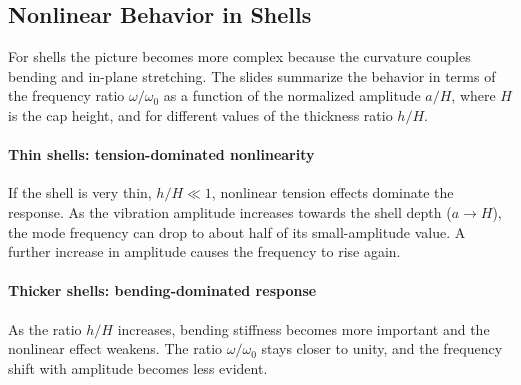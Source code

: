 \subsection{Nonlinear Behavior in Shells}

For shells the picture becomes more complex because the curvature couples bending and in-plane stretching. The slides summarize the behavior in terms of the frequency ratio \( \omega/\omega_0 \) as a function of the normalized amplitude \( a/H \), where \( H \) is the cap height, and for different values of the thickness ratio \( h/H \).

\paragraph{Thin shells: tension-dominated nonlinearity} If the shell is very thin, \( h/H  \ll 1 \), nonlinear tension effects dominate the response. As the vibration amplitude increases towards the shell depth (\( a \to H \)), the mode frequency can drop to about half of its small-amplitude value. A further increase in amplitude causes the frequency to rise again. 

\paragraph{Thicker shells: bending-dominated response} As the ratio \( h/H \) increases, bending stiffness becomes more important and the nonlinear effect weakens. The ratio \( \omega/\omega_0 \) stays closer to unity, and the frequency shift with amplitude becomes less evident.

